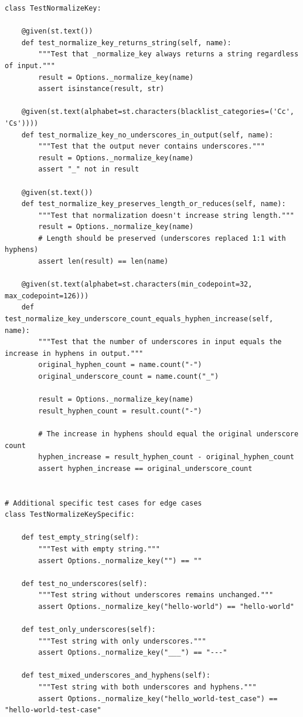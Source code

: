 \documentclass[a4paper]{scrreprt}
\begin{document}
\begin{aiTask}
\begin{answer}
\begin{lstlisting}[caption={Hypothesis-Test für \_normalize\_key by Maxim Zilke and Yossef Al Buni}, label={lst:normalize-key}]
class TestNormalizeKey:
    
    @given(st.text())
    def test_normalize_key_returns_string(self, name):
        """Test that _normalize_key always returns a string regardless of input."""
        result = Options._normalize_key(name)
        assert isinstance(result, str)
    
    @given(st.text(alphabet=st.characters(blacklist_categories=('Cc', 'Cs'))))
    def test_normalize_key_no_underscores_in_output(self, name):
        """Test that the output never contains underscores."""
        result = Options._normalize_key(name)
        assert "_" not in result
    
    @given(st.text())
    def test_normalize_key_preserves_length_or_reduces(self, name):
        """Test that normalization doesn't increase string length."""
        result = Options._normalize_key(name)
        # Length should be preserved (underscores replaced 1:1 with hyphens)
        assert len(result) == len(name)
    
    @given(st.text(alphabet=st.characters(min_codepoint=32, max_codepoint=126)))
    def test_normalize_key_underscore_count_equals_hyphen_increase(self, name):
        """Test that the number of underscores in input equals the increase in hyphens in output."""
        original_hyphen_count = name.count("-")
        original_underscore_count = name.count("_")
        
        result = Options._normalize_key(name)
        result_hyphen_count = result.count("-")
        
        # The increase in hyphens should equal the original underscore count
        hyphen_increase = result_hyphen_count - original_hyphen_count
        assert hyphen_increase == original_underscore_count


# Additional specific test cases for edge cases
class TestNormalizeKeySpecific:
    
    def test_empty_string(self):
        """Test with empty string."""
        assert Options._normalize_key("") == ""
    
    def test_no_underscores(self):
        """Test string without underscores remains unchanged."""
        assert Options._normalize_key("hello-world") == "hello-world"
    
    def test_only_underscores(self):
        """Test string with only underscores."""
        assert Options._normalize_key("___") == "---"
    
    def test_mixed_underscores_and_hyphens(self):
        """Test string with both underscores and hyphens."""
        assert Options._normalize_key("hello_world-test_case") == "hello-world-test-case"


\end{lstlisting}
\end{answer}
\end{aiTask}
\end{document}
